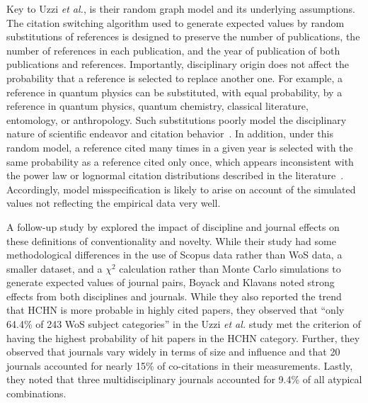 \documentclass[NETN]{stjour}
\begin{document}
Key to Uzzi {\em et al.}, is their random graph model and its underlying assumptions. The citation switching algorithm used to generate expected values by random substitutions of references is designed to preserve the number of publications, the number of references in each publication, and the year of publication of both publications and references. Importantly, disciplinary origin does not affect the probability that a reference is selected to replace another one. For example, a reference in quantum physics can be substituted, with equal probability, by a reference in quantum physics, quantum chemistry, classical literature, entomology, or anthropology. Such substitutions poorly model the disciplinary nature of scientific endeavor and citation behavior~\citep{wallace_lariviere_gingras_2012,moed_measuring_2010,klavans_research_2017,garfield_1979}. In addition, under this random model, a reference cited many times in a given year is selected with the same probability as a reference cited only once, which appears inconsistent with the power law or lognormal citation distributions described in the literature~\citep{stringer_statistical_2010,perline_strong_2005}.  Accordingly, model misspecification is likely to arise on account of the simulated values not reflecting the empirical data very well. 

A follow-up study by \cite{boyack_vs_uzzi_2014} explored the impact of discipline and journal effects on these definitions of conventionality and novelty.  While their study had some methodological differences in the use of Scopus data rather than WoS data, a smaller dataset, and a $\chi^2$ calculation rather than Monte Carlo simulations to generate expected values of journal pairs, Boyack and Klavans noted strong effects from both disciplines and journals. While they also reported the trend that HCHN is more probable in highly cited papers, they observed that ``only 64.4\%  of  243  WoS  subject  categories'' in the Uzzi {\em et al.} study met the criterion of having the highest probability of hit papers in the HCHN category.  Further, they observed that journals vary widely in terms of size and influence and that 20 journals accounted for nearly 15\% of co-citations in their measurements. Lastly, they noted that three multidisciplinary journals accounted for 9.4\% of all atypical combinations. 
\end{document}
